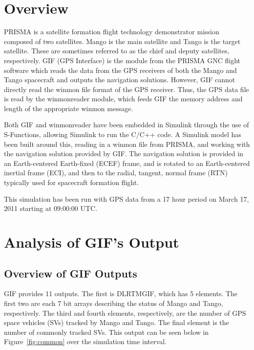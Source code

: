 \documentclass{article}
\begin{document}

\section{Overview}
PRISMA is a satellite formation flight technology demonstrator mission composed of two satellites. Mango is the main satellite and Tango is the target satellite. These are sometimes referred to as the chief and deputy satellites, respectively. GIF (GPS Interface) is the module from the PRISMA GNC flight software which reads the data from the GPS receivers of both the Mango and Tango spacecraft and outputs the navigation solutions. However, GIF cannot directly read the winmon file format of the GPS receiver. Thus, the GPS data file is read by the winmon\textunderscore reader module, which feeds GIF the memory address and length of the appropriate winmon message.

Both GIF and winmon\textunderscore reader have been embedded in Simulink through the use of S-Functions, allowing Simulink to run the C/C++ code. A Simulink model has been built around this, reading in a winmon file from PRISMA, and working with the navigation solution provided by GIF. The navigation solution is provided in an Earth-centered Earth-fixed (ECEF) frame, and is rotated to an Earth-centered inertial frame (ECI), and then to the radial, tangent, normal frame (RTN) typically used for spacecraft formation flight. 

This simulation has been run with GPS data from a 17 hour period on March 17, 2011 starting at 09:00:00 UTC. 

\section{Analysis of GIF's Output}
\subsection{Overview of GIF Outputs}
GIF provides 11 outputs. The first is DLR\textunderscore TM\textunderscore GIF, which has 5 elements. The first two are each 7 bit arrays describing the status of Mango and Tango, respectively. The third and fourth elements, respectively, are the number of GPS space vehicles (SVs) tracked by Mango and Tango. The final element is the number of commonly tracked SVs. This output can be seen below in Figure~\ref{fig:common} over the simulation time interval.
\end{document}
